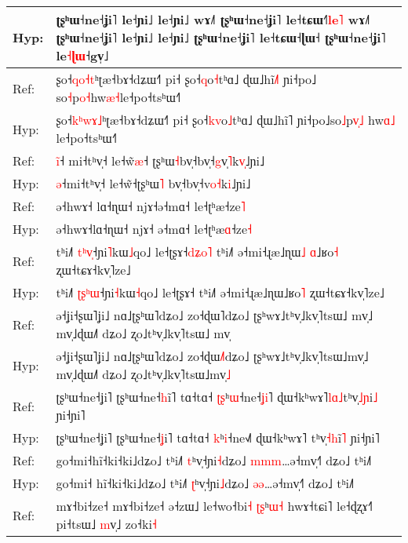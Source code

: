 \documentclass[10pt]{article}
\DeclareRobustCommand{\hl}[1]{{\textcolor{red}{#1}}}
\begin{document}
\begin{longtable}{ll}
Hyp: & ʈʂʰɯ˧ne˧ʝi˥ le˧ɲi˩ le˧ɲi˩ wɤ˩˥ ʈʂʰɯ˧ne˧ʝi˥ le˧tɕɯ˧\hl{˥}\hl{l}\hl{e}\hl{˥} wɤ˩˥ ʈʂʰɯ˧ne˧ʝi˥ le˧ɲi˩ le˧ɲi˩ ʈʂʰɯ˧ne˧ʝi˥ le˧tɕɯ˧ɭɯ˧ ʈʂʰɯ˧ne˧ʝi˥ le\hl{˧}\hl{ɭ}\hl{ɯ}˧gv̩˩ \\ 
\midrule 
Ref: & ʂo˧\hl{q}\hl{o}\hl{˧}\hl{t}ʰʈæ˧bɤ˧dʑɯ˧˥ pi˧ ʂo˧\hl{q}o\hl{˧}tʰɑ˩ ɖɯ˩hĩ\hl{˩}˥ ɲi˧po˩\hl{ }so\hl{˧}p\hl{o}\hl{˧}hw\hl{æ}\hl{˧}le˧po˧tsʰɯ˧˥ \\ 
Hyp: & ʂo˧\hl{k}\hl{ʰ}\hl{w}\hl{ɤ}\hl{˩}ʰʈæ˧bɤ˧dʑɯ˧˥ pi˧ ʂo˧\hl{k}\hl{v}o\hl{˩}tʰɑ˩ ɖɯ˩hĩ˥ ɲi˧po˩so\hl{˩}p\hl{v}\hl{̩}\hl{˩}\hl{ }hw\hl{ɑ}\hl{˩}\hl{ }le˧po˧tsʰɯ˧˥ \\ 
\midrule 
Ref: & \hl{i}\hl{̃}˧\hl{ }mi˧tʰv̩˧ le˧w̃\hl{æ}˧\hl{ }ʈʂʰɯ\hl{˧}bv̩˧bv̩˧\hl{g}v\hl{̩}\hl{˥}k\hl{v}\hl{̩}˩ɲi˩ \\ 
Hyp: & \hl{ə}˧mi˧tʰv̩˧ le˧w̃˧ʈʂʰɯ\hl{˥}\hl{ }bv̩˧bv̩˧v\hl{o}\hl{˧}k\hl{i}˩ɲi˩ \\ 
\midrule 
Ref: & ə˧hwɤ˧\hl{ }lɑ˧ɳɯ˧ njɤ˧ə˧mɑ˧ le˧ʈʰæ˧ze\hl{˥} \\ 
Hyp: & ə˧hwɤ˧lɑ˧ɳɯ˧ njɤ˧\hl{ }ə˧mɑ˧ le˧ʈʰæ\hl{ɑ}˧ze\hl{˧} \\ 
\midrule 
Ref: & tʰi˩˥ \hl{t}\hl{ʰ}\hl{v}\hl{̩}˧ɲi\hl{˥}kɯ\hl{˩}qo˩ le˧ʈʂɤ˧\hl{d}\hl{ʑ}\hl{o}\hl{˥} tʰi˩˥ ə˧mi˧ɻæ˩ɳɯ\hl{˩}\hl{ }\hl{ɑ}˩ʁo\hl{˧} ʐɯ˧tɕɤ˧kv̩˥ze˩ \\ 
Hyp: & tʰi˩˥ \hl{ʈ}\hl{ʂ}\hl{ʰ}\hl{ɯ}˧ɲi\hl{˧}kɯ\hl{˧}qo˩ le˧ʈʂɤ˧ tʰi˩˥ ə˧mi˧ɻæ˩ɳɯ˩ʁo\hl{˥} ʐɯ˧tɕɤ˧kv̩˥ze˩ \\ 
\midrule 
Ref: & ə˧ʝi˧ʂɯ˥ʝi˩ nɑ˩ʈʂʰɯ˥dʑo˩ zo˧ɖɯ˥dʑo˩ ʈʂʰwɤ˩tʰv̩˩kv̩˥tsɯ˩\hl{ }mv̩˩ mv̩˩ɖɯ˩˥ dʑo˩ ʐo˩tʰv̩˩kv̩˥tsɯ˩\hl{ }mv̩ \\ 
Hyp: & ə˧ʝi˧ʂɯ˥ʝi˩ nɑ˩ʈʂʰɯ˥dʑo˩ zo˧ɖɯ\hl{˩}˥dʑo˩ ʈʂʰwɤ˩tʰv̩˩kv̩˥tsɯ˩mv̩˩ mv̩˩ɖɯ˩˥ dʑo˩ ʐo˩tʰv̩˩kv̩˥tsɯ˩mv̩\hl{˩} \\ 
\midrule 
Ref: & ʈʂʰɯ˧ne˧ʝi˥ ʈʂʰɯ˧ne˧\hl{h}i\hl{̃}˥ tɑ˧tɑ˧ \hl{ʈ}\hl{ʂ}ʰ\hl{ɯ}˧ne˧\hl{ʝ}\hl{i}˥ ɖɯ˧kʰwɤ˥\hl{l}\hl{ɑ}\hl{˩}tʰv̩\hl{˩}\hl{ɲ}i\hl{˩} ɲi˧ɲi˥ \\ 
Hyp: & ʈʂʰɯ˧ne˧ʝi˥ ʈʂʰɯ˧ne˧\hl{ʝ}i˥ tɑ˧tɑ˧ \hl{k}ʰ\hl{i}˧ne˧\hl{˩}˥ ɖɯ˧kʰwɤ˥\hl{ }tʰv̩\hl{˧}\hl{h}i\hl{̃}\hl{˥} ɲi˧ɲi˥ \\ 
\midrule 
Ref: & go˧mi˧hĩ˧ki˧ki˩dʑo˩ tʰi˩˥ \hl{t}ʰv̩˧ɲi\hl{˧}dʑo˩ \hl{m}\hl{m}\hl{m}…ə˧mv̩˧˥ dʑo˩ tʰi˩˥ \\ 
Hyp: & go˧mi˧\hl{ }hĩ˧ki˧ki˩dʑo˩ tʰi˩˥ \hl{ʈ}ʰv̩˧ɲi\hl{˩}dʑo˩ \hl{ə}\hl{ə}…ə˧mv̩˧˥ dʑo˩ tʰi˩˥ \\ 
\midrule 
Ref: & mɤ˧bi˧ze˧\hl{ }mɤ˧bi˧ze˧ ə˧zɯ˩ le˧wo˧bi\hl{˧} \hl{ʈ}\hl{ʂ}ʰ\hl{ɯ}\hl{˧}\hl{ }hwɤ˧tɕi˥ le˧ɖʐɤ˧˥ pi˧tsɯ˩ \hl{m}v̩˩\hl{ }zo˧ki\hl{˧} \\ 

\end{longtable}
\end{document}
